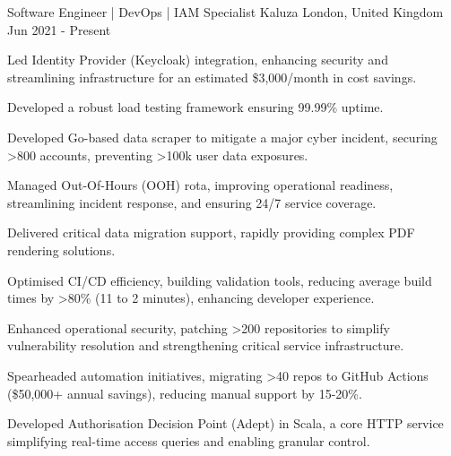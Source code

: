 

\begin{cventries}

  \cventry
  {Software Engineer | DevOps | IAM Specialist} %
  {Kaluza} %
  {London, United Kingdom} %
  {Jun 2021 - Present} %
  {
    \begin{cvitems} %
      \item {Led Identity Provider (Keycloak) integration, enhancing security and streamlining infrastructure for an estimated \$3,000/month in cost savings.}
      \item {Developed a robust load testing framework ensuring 99.99\% uptime.}
      \item {Developed Go-based data scraper to mitigate a major cyber incident, securing >800 accounts, preventing >100k user data exposures.}
      \item {Managed Out-Of-Hours (OOH) rota, improving operational readiness, streamlining incident response, and ensuring 24/7 service coverage.}
      \item {Delivered critical data migration support, rapidly providing complex PDF rendering solutions.}
      \item {Optimised CI/CD efficiency, building validation tools, reducing average build times by >80\% (11 to 2 minutes), enhancing developer experience.}
      \item {Enhanced operational security, patching >200 repositories to simplify vulnerability resolution and strengthening critical service infrastructure.}
      \item {Spearheaded automation initiatives, migrating >40 repos to GitHub Actions (\$50,000+ annual savings), reducing manual support by 15-20\%.}
      \item {Developed Authorisation Decision Point (Adept) in Scala, a core HTTP service simplifying real-time access queries and enabling granular control.}

\end{cvitems}}
\end{cventries}

